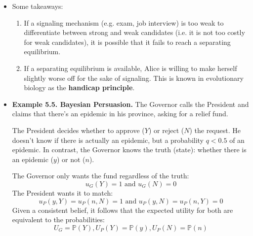 \documentclass[notitlepage]{article}
\begin{document}
\begin{itemize}
    \begin{itemize}
        \item While we have confirmed that a polling PBE exists, does this make sense?
        \item We know that Average Alice must not go to college in any PBE. However, the pooling equilibrium requires that \(p \le \frac{1}{3}\), that is, the firm thinks that an Alice who went to college is unlikely to be Smart!
        \item Thus, we want to kick out some equilibria that are unreasonable, i.e. \textbf{equilibrium refinement}.
        \item \textbf{Intuitive criterion}: If an unexpected deviation occurs (e.g. Alice going to college in pooling equilibrium), the receiver (e.g. the firm) must assign zero probability to any sender type that could never benefit from that deviation under any plausible response (e.g. Average Alice).
        \item In this case, we must assign \(p=1\), which eliminates this polling equilibrium.
    \end{itemize}
    \item Some takeaways:
    \begin{enumerate}
        \item If a signaling mechanism (e.g. exam, job interview) is too weak to differentiate between strong and weak candidates (i.e. it is not too costly for weak candidates), it is possible that it fails to reach a separating equilibrium.
        \item If a separating equilibrium is available, Alice is willing to make herself slightly worse off for the sake of signaling. This is known in evolutionary biology as the \textbf{handicap principle}.
    \end{enumerate}

    \item \textbf{Example 5.5. Bayesian Persuasion.} The Governor calls the President and claims that there's an epidemic in his province, asking for a relief fund.

    The President decides whether to approve (\(Y\)) or reject (\(N\)) the request. He doesn't know if there is actually an epidemic, but a probability \(q<0.5\) of an epidemic. In contrast, the Governor knows the truth (state): whether there is an epidemic (\(y\)) or not (\(n\)).

    The Governor only wants the fund regardless of the truth: 
    \[u_G(Y) = 1 \text{ and } u_G(N) = 0\]
    The President wants it to match: 
    \[u_P(y,Y) = u_P(n,N) = 1 \text{ and } u_P(y,N) = u_P(n,Y) = 0\]
    Given a consistent belief, it follows that the expected utility for both are equivalent to the probabilities: 
    \[U_G = \mathbb{P}(Y), U_P(Y) = \mathbb{P}(y), U_P(N) = \mathbb{P}(n)\]


\end{itemize}
\end{document}
